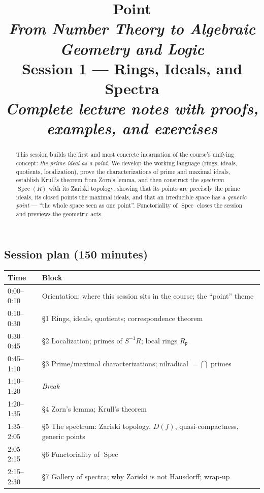 \documentclass[11pt,a4paper]{article}
\title{
	{\color{blue!40!black}\textbf{\Huge Point}}\\[0.3em]
	\Large \textit{From Number Theory to Algebraic Geometry and Logic}\\[0.7em]
	\large \textbf{Session 1 --- Rings, Ideals, and Spectra}\\[0.3em]
	\normalsize \emph{Complete lecture notes with proofs, examples, and exercises}
}
\author{}
\date{}
\theoremstyle{definition}
\newcommand{\Spec}{\operatorname{Spec}}
\newcommand{\p}{\mathfrak{p}}
\begin{document}
	\maketitle
	\thispagestyle{empty}
	
	\begin{abstract}
		\noindent
		This session builds the first and most concrete incarnation of the course's unifying concept:
		\emph{the prime ideal as a point}. We develop the working language (rings, ideals, quotients,
		localization), prove the characterizations of prime and maximal ideals, establish Krull's
		theorem from Zorn's lemma, and then construct the \emph{spectrum} $\Spec(R)$ with its Zariski
		topology, showing that its points are precisely the prime ideals, its closed points the maximal
		ideals, and that an irreducible space has a \emph{generic point} --- ``the whole space seen as
		one point''. Functoriality of $\Spec$ closes the session and previews the geometric acts.
	\end{abstract}
	
	\subsection*{Session plan (150 minutes)}
	\begin{center}\small
		\begin{tabular}{|l|l|}
			\hline
			\textbf{Time} & \textbf{Block} \\
			\hline
			0:00--0:10 & Orientation: where this session sits in the course; the ``point'' theme \\
			0:10--0:30 & \S1 Rings, ideals, quotients; correspondence theorem \\
			0:30--0:45 & \S2 Localization; primes of $S^{-1}R$; local rings $R_\p$ \\
			0:45--1:10 & \S3 Prime/maximal characterizations; nilradical $=\bigcap$ primes \\
			1:10--1:20 & \emph{Break} \\
			1:20--1:35 & \S4 Zorn's lemma; Krull's theorem \\
			1:35--2:05 & \S5 The spectrum: Zariski topology, $D(f)$, quasi-compactness, generic points \\
			2:05--2:15 & \S6 Functoriality of $\Spec$ \\
			2:15--2:30 & \S7 Gallery of spectra; why Zariski is not Hausdorff; wrap-up \\
			\hline
		\end{tabular}
	\end{center}
	
\end{document}
